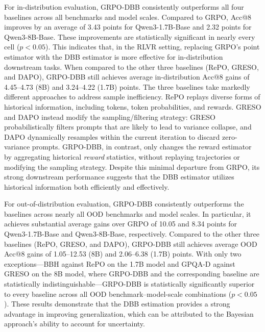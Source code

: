 For in-distribution evaluation, GRPO-DBB consistently outperforms all four baselines across all benchmarks and model scales.
Compared to GRPO, Acc@8 improves by an average of 3.43 points for Qwen3-1.7B-Base and 2.32 points for Qwen3-8B-Base.
These improvements are statistically significant in nearly every cell ($p<0.05$).
This indicates that, in the RLVR setting, replacing GRPO's point estimator with the DBB estimator is more effective for in-distribution downstream tasks.
When compared to the other three baselines (RePO, GRESO, and DAPO), GRPO-DBB still achieves average in-distribution Acc@8 gains of 4.45--4.73 (8B) and 3.24--4.22 (1.7B) points.
The three baselines take markedly different approaches to address sample inefficiency.
RePO replays diverse forms of historical information, including tokens, token probabilities, and rewards.
GRESO and DAPO instead modify the sampling/filtering strategy: GRESO probabilistically filters prompts that are likely to lead to variance collapse, and DAPO dynamically resamples within the current iteration to discard zero-variance prompts.
GRPO-DBB, in contrast, only changes the reward estimator by aggregating historical \emph{reward} statistics, without replaying trajectories or modifying the sampling strategy.
Despite this minimal departure from GRPO, its strong downstream performance suggests that the DBB estimator utilizes historical information both efficiently and effectively.

For out-of-distribution evaluation, GRPO-DBB consistently outperforms the baselines across nearly all OOD benchmarks and model scales.
In particular, it achieves substantial average gains over GRPO of 10.05 and 8.34 points for Qwen3-1.7B-Base and Qwen3-8B-Base, respectively.
Compared to the other three baselines (RePO, GRESO, and DAPO), GRPO-DBB still achieves average OOD Acc@8 gains of 1.05--12.53 (8B) and 2.06--6.38 (1.7B) points.
With only two exceptions---BBH against RePO on the 1.7B model and GPQA-D against GRESO on the 8B model, where GRPO-DBB and the corresponding baseline are statistically indistinguishable---GRPO-DBB is statistically significantly superior to every baseline across all OOD benchmark--model-scale combinations ($p<0.05$).
These results demonstrate that the DBB estimation provides a strong advantage in improving generalization, which can be attributed to the Bayesian approach's ability to account for uncertainty.
